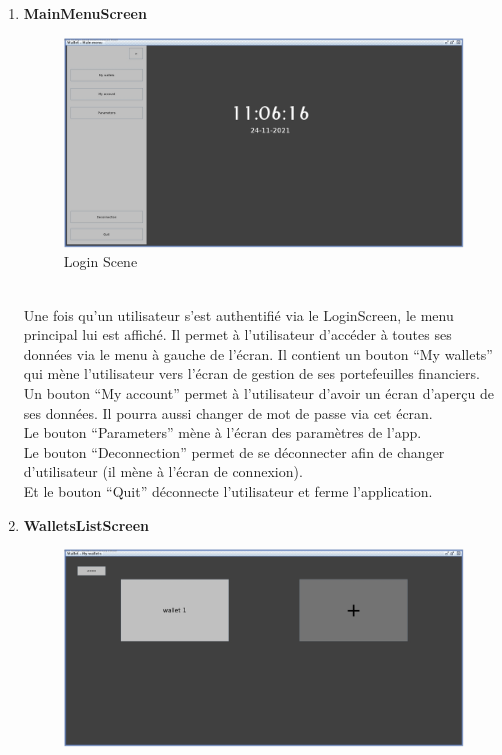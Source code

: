 \documentclass[../rapport.tex]{subfiles}
\begin{document}
\begin{enumerate}
\item \textbf{MainMenuScreen} \\
		\begin{figure}[h!]
				\centering \includegraphics[scale=0.2]{ressources/photos_diagrammes/app1/gui/mainMenu.jpg}
				\caption{Login Scene}
		\end{figure}
		\\
Une fois qu'un utilisateur s'est authentifié via le LoginScreen, le menu principal lui est affiché. Il permet à l'utilisateur d'accéder à toutes ses données via le menu à 
gauche de l'écran. Il contient un bouton ``My wallets'' qui mène l'utilisateur vers l'écran de gestion de ses portefeuilles financiers.\\
Un bouton ``My account'' permet à l'utilisateur d'avoir un écran d'aperçu de ses données. Il pourra aussi changer de mot de passe via cet écran.\\
Le bouton ``Parameters'' mène à l'écran des paramètres de l'app.\\
Le bouton ``Deconnection'' permet de se déconnecter afin de changer d'utilisateur (il mène à l'écran de connexion).\\
Et le bouton ``Quit'' déconnecte l'utilisateur et ferme l'application.
\newpage
\item \textbf{WalletsListScreen} \\
		\begin{figure}[h!]
				\centering \includegraphics[scale=0.2]{ressources/photos_diagrammes/app1/gui/walletsList.jpg}

\end{figure}
\end{enumerate}
\end{document}
